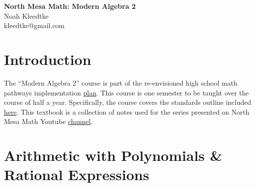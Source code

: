 \documentclass[12pt, oneside]{book}
\begin{document}
\begin{titlepage}
    \centering
    \vspace*{5cm}
    {\Huge \bfseries North Mesa Math: Modern Algebra 2} \\[1.5cm]
    {\Large Noah Kleedtke} \\
    {\Large kleedtke@gmail.com} \\
    \vfill
\end{titlepage}

\frontmatter
\tableofcontents

\mainmatter
\chapter{Introduction}

The ``Modern Algebra 2'' course is part of the re-envisioned high school math pathways implementation \href{https://docs.google.com/document/d/1_troJgcLZ26nQNs2aGX06zfQDgV2aJ5XbGDfhzA-p6I/edit?tab=t.0}{plan}. This course is one semester to be taught over the course of half a year. Specifically, the course covers the standards outline included \href{web.ped.nm.gov}{here}. This textbook is a collection of notes used for the series presented on North Mesa Math Youtube \href{youtube.com/@NorthMesaMath}{channel}.

\chapter{Arithmetic with Polynomials \& Rational Expressions}
\end{document}
